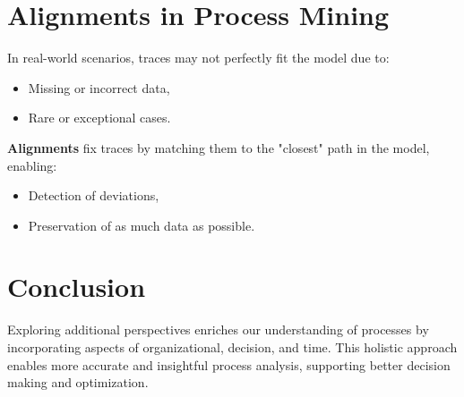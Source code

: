 \section{Alignments in Process Mining}

In real-world scenarios, traces may not perfectly fit the model due to:
\begin{itemize}
    \item Missing or incorrect data,
    \item Rare or exceptional cases.
\end{itemize}

\textbf{Alignments} fix traces by matching them to the "closest" path in the model, enabling:
\begin{itemize}
    \item Detection of deviations,
    \item Preservation of as much data as possible.
\end{itemize}

\section{Conclusion}

Exploring additional perspectives enriches our understanding of processes by incorporating aspects of organizational, decision, and time. This holistic approach enables more accurate and insightful process analysis, supporting better decision making and optimization.
